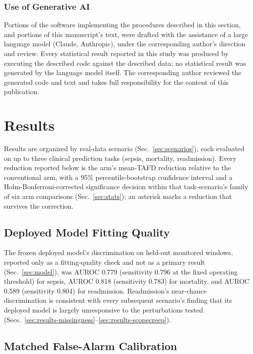 \documentclass[apajournal,article,submit,oneauthor]{Definitions/mdpi}
\begin{document}
\subsubsection{Use of Generative AI}\label{sec:genai}

Portions of the software implementing the procedures described in this section, and portions of this manuscript's text, were drafted with the assistance of a large language model (Claude, Anthropic), under the corresponding author's direction and review. Every statistical result reported in this study was produced by executing the described code against the described data; no statistical result was generated by the language model itself. The corresponding author reviewed the generated code and text and takes full responsibility for the content of this publication.

\section{Results}

Results are organized by real-data scenario (Sec.~\ref{sec:scenarios}), each evaluated on up to three clinical prediction tasks (sepsis, mortality, readmission). Every reduction reported below is the arm's mean-TAFD reduction relative to the conventional arm, with a 95\% percentile-bootstrap confidence interval and a Holm-Bonferroni-corrected significance decision within that task-scenario's family of six arm comparisons (Sec.~\ref{sec:stats}); an asterisk marks a reduction that survives the correction.

\subsection{Deployed Model Fitting Quality}\label{sec:results-fitting}

The frozen deployed model's discrimination on held-out monitored windows, reported only as a fitting-quality check and not as a primary result (Sec.~\ref{sec:model}), was AUROC 0.779 (sensitivity 0.796 at the fixed operating threshold) for sepsis, AUROC 0.818 (sensitivity 0.783) for mortality, and AUROC 0.589 (sensitivity 0.804) for readmission. Readmission's near-chance discrimination is consistent with every subsequent scenario's finding that its deployed model is largely unresponsive to the perturbations tested (Secs.~\ref{sec:results-missingness}--\ref{sec:results-scopecreep}).

\subsection{Matched False-Alarm Calibration}
\end{document}
